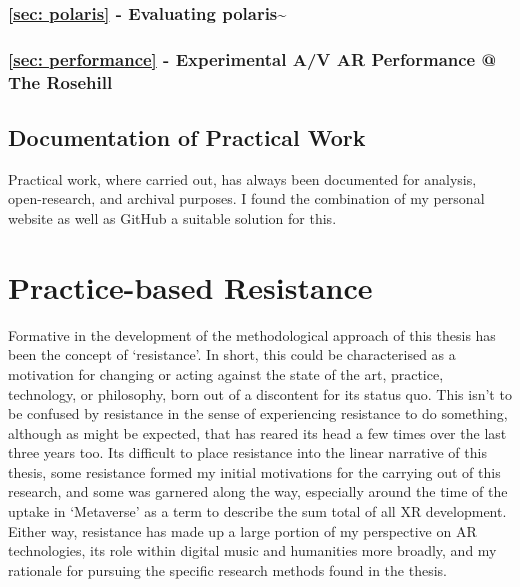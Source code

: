 \subsubsection{\autoref{sec: polaris} - Evaluating polaris\textasciitilde{}}
\subsubsection{\autoref{sec: performance} - Experimental A/V AR Performance @ The Rosehill}

\subsection{Documentation of Practical Work}\label{sec: method-outline-documentation}
Practical work, where carried out, has always been documented for analysis, open-research, and archival purposes. I found the combination of my personal website as well as GitHub a suitable solution for this.



\section{Practice-based Resistance}\label{sec: method-resistance}
Formative in the development of the methodological approach of this thesis has been the concept of `resistance'. In short, this could be characterised as a motivation for changing or acting against the state of the art, practice, technology, or philosophy, born out of a discontent for its status quo. This isn't to be confused by resistance in the sense of experiencing resistance to do something, although as might be expected, that has reared its head a few times over the last three years too. Its difficult to place resistance into the linear narrative of this thesis, some resistance formed my initial motivations for the carrying out of this research, and some was garnered along the way, especially around the time of the uptake in `Metaverse' as a term to describe the sum total of all XR development. Either way, resistance has made up a large portion of my perspective on AR technologies, its role within digital music and humanities more broadly, and my rationale for pursuing the specific research methods found in the thesis.

